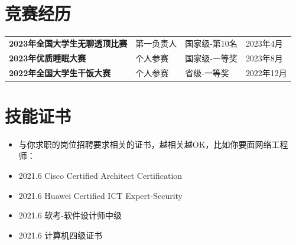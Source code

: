 \documentclass[10pt]{article}
\begin{document}
    \section{\makebox[\widthof{\faTrophy}][c]{\color{CQMU_Green}{\faTrophy}}\quad 竞赛经历}
    \vspace{-1em}
    \begin{table}[h!]
        \begin{tabularx}{\textwidth}{Xp{}p{}p{}}
            \textbf{2023年全国大学生无聊透顶比赛} & 第一负责人 & 国家级-第10名 & 2023年4月 \\
            \textbf{2023年优质睡眠大赛} & 个人参赛 & 国家级-一等奖 & 2023年8月\\
            \textbf{2022年全国大学生干饭大赛} & 个人参赛 & 省级-一等奖 & 2022年12月\\
        \end{tabularx}
    \end{table}

    \section{\makebox[\widthof{\faCertificate}][c]{\color{CQMU_Green}{\faCertificate}}\quad 技能证书}
    \vspace{0.5em}
    \begin{itemize}
        \item 与你求职的岗位招聘要求相关的证书，越相关越OK，比如你要面网络工程师：
        \item 2021.6 \hspace{2em} Cisco Certified Architect Certification
        \item 2021.6 \hspace{2em} Huawei Certified ICT Expert-Security
        \item 2021.6 \hspace{2em} 软考-软件设计师中级
        \item 2021.6 \hspace{2em} 计算机四级证书
    \end{itemize}

\end{document}
